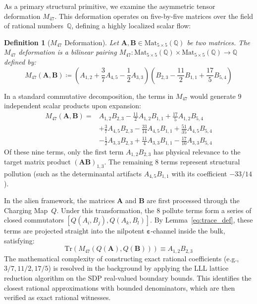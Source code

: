 \documentclass[11pt,a4paper]{book}
\newtheorem{definition}[theorem]{Definition}
\begin{document}
As a primary structural primitive, we examine the asymmetric tensor deformation $M_{47}$. 
This deformation operates on five-by-five matrices over the field of rational numbers~$\mathbb{Q}$, defining a highly localized scalar flow:

\begin{definition}[$M_{47}$ Deformation]
Let $\mathbf{A}, \mathbf{B} \in \text{Mat}_{5 \times 5}(\mathbb{Q})$ be two matrices. 
The $M_{47}$ deformation is a bilinear pairing $M_{47}: \text{Mat}_{5 \times 5}(\mathbb{Q} ) \times \text{Mat}_{5 \times 5}(\mathbb{Q}) \to \mathbb{Q}$ defined by:
\begin{equation}
\label{eq:m47_formula}
M_{47}(\mathbf{A}, \mathbf{B}) \coloneqq \left( A_{1,2} + \frac{3}{7} A_{4,5} - \frac{1}{2} A_{3,3} \right) \left( B_{2,3} - \frac{11}{2} B_{1,1} + \frac{17}{5} B_{5,4} \right)
\end{equation}
\end{definition}

In a standard commutative decomposition, the terms in $M_{47}$ would generate 9 independent scalar products upon expansion:
\begin{equation}
\label{eq:m47_expansion}
\begin{aligned}
M_{47}(\mathbf{A}, \mathbf{B}) = & A_{1,2}B_{2,3} - \frac{11}{2}A_{1,2}B_{1,1} + \frac{17}{5}A_{1,2}B_{5,4} \\
& + \frac{3}{7}A_{4,5}B_{2,3} - \frac{33}{14}A_{4,5}B_{1,1} + \frac{51}{35}A_{4,5}B_{5,4} \\
& - \frac{1}{2}A_{3,3}B_{2,3} + \frac{11}{4}A_{3,3}B_{1,1} - \frac{17}{10}A_{3,3}B_{5,4}
\end{aligned}
\end{equation}
Of these nine terms, only the first term $A_{1,2}B_{2,3}$ has physical relevance to the target matrix product $(\mathbf{A}\mathbf{B})_{1,3}$. 
The remaining 8 terms represent structural pollution (such as the determinantal artifacts $A_{4,5}B_{1,1}$ with its coefficient $-33/14$).

In the alien framework, the matrices $\mathbf{A}$ and $\mathbf{B}$ are first processed through the Charging Map~$Q$. 
Under this transformation, the 8 pollute terms form a series of closed commutators $[Q(A_i, B_j), Q(A_k, B_l)]$. 
By Lemma~\ref{eq:trace_def}, these terms are projected straight into the nilpotent $\boldsymbol{\varepsilon}$-channel inside the bulk, satisfying:
\begin{equation}
\text{Tr}\left( M_{47}(Q(\mathbf{A}), Q(\mathbf{B})) \right) \equiv A_{1,2}B_{2,3}
\end{equation}
The mathematical complexity of constructing exact rational coefficients (e.g., $3/7, 11/2, 17/5$) is resolved in the background by applying the LLL lattice reduction algorithm on the SDP real-valued boundary bounds. 
This identifies the closest rational approximations with bounded denominators, which are then verified as exact rational witnesses.
\end{document}
